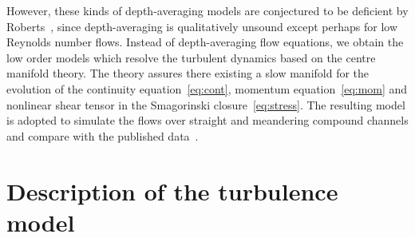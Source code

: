 \documentclass[twocolumn]{afmc_art}
\begin{document}
However, these kinds of depth-averaging models are conjectured to be deficient by Roberts~\cite{Roberts1996}, since depth-averaging is qualitatively unsound except perhaps for low Reynolds number flows.
Instead of depth-averaging flow equations, we obtain the low order models which resolve the turbulent dynamics based on the centre manifold theory. 
The theory assures there existing a slow manifold for the evolution of the continuity equation~\eqref{eq:cont}, momentum equation~\eqref{eq:mom} and nonlinear shear tensor in the Smagorinski closure~\eqref{eq:stress}.
The resulting model is adopted to simulate the flows over straight and meandering compound channels and compare with the published data~\cite[e.g.]{Bousmar2002,Liu2009}.


\section{Description of the turbulence model}
\end{document}
